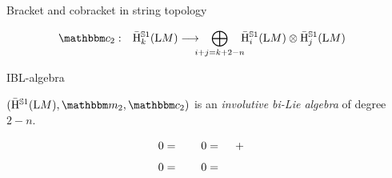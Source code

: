 \documentclass[xcolor=dvipsnames]{beamer}
\providecommand{\MainFolder}{.}
\providecommand{\GraphicsFolder}{\MainFolder/Graphics}
\theoremstyle{plain}
\newcommand{\vcenterline}[1]{\begingroup
	\setbox0=\hbox{#1}
	\parbox{\wd0}{\box0}\endgroup} %
\renewcommand{\emph}[1]{{\itshape\color{pink}#1}}
\begin{document}
\begin{frame}[fragile]{Bracket and cobracket in string topology}
\begin{itemize}
\begin{align*}
\StringCoOp_2:&&  \bar{\H}^{\Sph{1}}_k(\Loop M) &\longrightarrow\!\!\!\!\bigoplus_{i + j = k + 2 - n}\!\!\!\bar{\H}^{\Sph{1}}_i(\Loop M) \otimes \bar{\H}^{\Sph{1}}_j(\Loop M)
\end{align*}
\end{itemize}
\end{frame}

\begin{frame}{IBL-algebra}
\begin{theorem}
$(\bar{\H}^{\Sph{1}}(\Loop M), \StringOp_2, \StringCoOp_2)$ is an \emph{involutive bi-Lie algebra} of degree $2-n$.
\end{theorem}\pause

{ \begingroup \allowdisplaybreaks
\def\dist{0.25} %
  \def\rad{0.4} %
  \def\ecc{0.1} %
  \def\hght{1} %
  \def\dif{1.1} %
  \def\difbig{1.5*\dif} %
  \def\radO{\rad} %
  \def\eccO{\ecc} %
  \def\hghtO{2*\hght+\dist} %
  \def\difO{\dif} %
  \def\gencanc{0.05} %
  \def\genecc{20} %
  \def\genrad{0.3} %
  \newcommand{\PicScaling}{.8}
\begin{align*}
0 & =\quad\vcenterline{} & 0&=\quad \vcenterline{} +\quad \vcenterline{}\\[1ex] 
0&=\quad \vcenterline{} & 0& =\quad \vcenterline{}
\end{align*}
\endgroup}
\end{frame}
\end{document}
